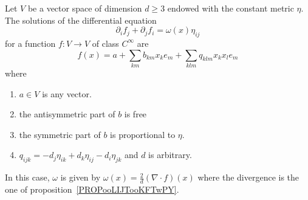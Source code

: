 \begin{lemma}
	Let \( V\) be a vector space of dimension \( d\geq 3\) endowed with the constant metric \( \eta\). The solutions of the differential equation
	\begin{equation}    \label{EQooVBIMooOBKAKQ}
		\partial_if_j+\partial_jf_i=\omega(x)\eta_{ij}
	\end{equation}
	for a function \( f\colon V\to V\) of class \(  C^{\infty}\) are
	\begin{equation}    \label{EQooEFOMooUhcgfT}
		f(x)=a+\sum_{km}b_{km}x_ke_m+\sum_{klm}q_{klm}x_kx_le_m
	\end{equation}
	where
	\begin{enumerate}
		\item
		      \( a\in V\) is any vector.
		\item
		      the antisymmetric part of \( b\) is free
		\item
		      the symmetric part of \( b\) is proportional to \( \eta\).
		\item
		      \( q_{ijk}=-d_j\eta_{ik}+d_k\eta_{ij}-d_i\eta_{jk}\) and \( d\) is arbitrary.
	\end{enumerate}
	In this case, \( \omega\) is given by \( \omega(x)=\frac{ 2 }{ d }(\nabla\cdot f)(x)\) where the divergence is the one of proposition~\ref{PROPooLIJTooKFTwPY}.
\end{lemma}

